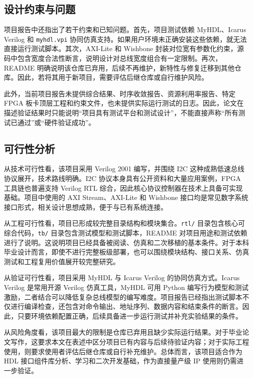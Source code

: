 \documentclass[12pt,a4paper]{article}
\numberwithin{equation}{section}
\begin{document}
\subsection{设计约束与问题}

项目报告中还指出了若干约束和已知问题。首先，项目测试依赖 MyHDL、Icarus Verilog 和 \texttt{myhdl.vpi} 协同仿真支持。如果用户环境未正确安装这些依赖，就无法直接运行测试脚本。其次，AXI-Lite 和 Wishbone 封装对位宽有参数化约束，源码中包含宽度合法性断言，说明设计对总线宽度组合有一定限制。再次，README 明确说明该仓库已弃用，后续不再维护，新特性与修复迁移到其他仓库。因此，若将其用于新项目，需要评估后继仓库或自行维护风险。

此外，当前项目报告未提供综合结果、时序收敛报告、资源利用率报告、特定 FPGA 板卡顶层工程和约束文件，也未提供实际运行测试的日志。因此，论文在描述验证结果时只能说明“项目具有测试平台和测试设计”，不能直接声称“所有测试已通过”或“硬件验证成功”。

\subsection{可行性分析}

从技术可行性看，该项目采用 Verilog 2001 编写，并围绕 I2C 这种成熟低速总线协议展开，技术路线明确。I2C 协议本身具有公开资料和大量应用案例，FPGA 工具链也普遍支持 Verilog RTL 综合，因此核心协议控制器在技术上具备可实现基础。项目中使用的 AXI Stream、AXI-Lite 和 Wishbone 接口均是常见数字系统接口形式，相关设计思想成熟，便于与已有系统连接。

从工程可行性看，项目已形成较完整目录结构和模块集合。\texttt{rtl/} 目录包含核心可综合代码，\texttt{tb/} 目录包含测试模型和测试脚本，README 对项目用途和测试依赖进行了说明。这说明项目已经具备被阅读、仿真和二次移植的基本条件。对于本科毕业设计而言，即使不进行完整板级部署，也可以围绕模块结构、接口关系、仿真测试和工程复用价值展开较完整研究。

从验证可行性看，项目采用 MyHDL 与 Icarus Verilog 的协同仿真方式。Icarus Verilog 是常用开源 Verilog 仿真工具，MyHDL 可用 Python 编写行为模型和测试激励，二者结合可以降低复杂总线模型的编写难度。项目报告已经指出测试脚本不仅进行编译检查，还包含对命令输出、地址序列、数据内容和结束条件的断言。因此，只要环境依赖配置正确，后续具备进一步运行测试并补充实验结果的条件。

从风险角度看，该项目最大的限制是仓库已弃用且缺少实际运行结果。对于毕业论文写作，这要求本文在表述中区分项目已有内容与后续待验证内容；对于实际工程使用，则要求使用者评估后继仓库或自行补充维护。总体而言，该项目适合作为 HDL 接口组件库分析、学习和二次开发基础，作为直接量产级 IP 使用则仍需进一步验证。
\end{document}
